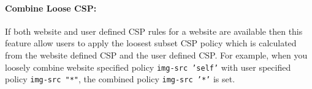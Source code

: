 \paragraph{\bf Combine Loose CSP:} If both website and user defined CSP rules for a website are available then this feature allow users to apply the loosest subset CSP policy which is calculated from the website defined CSP and the user defined CSP. For example, when you loosely combine website specified policy {\tt img-src 'self'} with user specified policy {\tt img-src "*"}, the combined policy {\tt img-src '*'} is set.


